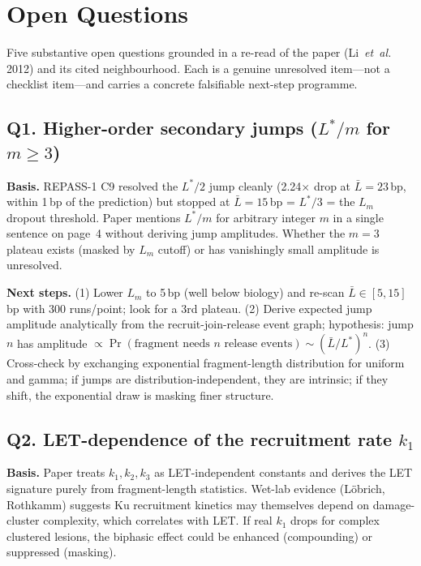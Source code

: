 \section*{Open Questions}

Five substantive open questions grounded in a re-read of the paper (Li~\emph{et~al.} 2012)
and its cited neighbourhood. Each is a genuine unresolved item---not a checklist
item---and carries a concrete falsifiable next-step programme.

\subsection*{Q1. Higher-order secondary jumps ($L^\ast/m$ for $m\geq 3$)}

\textbf{Basis.} REPASS-1 C9 resolved the $L^\ast/2$ jump cleanly (2.24$\times$ drop at
$\bar L=23$\,bp, within 1\,bp of the prediction) but stopped at $\bar L=15$\,bp = $L^\ast/3$
= the $L_m$ dropout threshold. Paper mentions $L^\ast/m$ for arbitrary integer $m$ in a
single sentence on page~4 without deriving jump amplitudes. Whether the $m{=}3$ plateau
exists (masked by $L_m$ cutoff) or has vanishingly small amplitude is unresolved.

\textbf{Next steps.} (1) Lower $L_m$ to 5\,bp (well below biology) and re-scan
$\bar L \in [5,15]$\,bp with 300 runs/point; look for a 3rd plateau. (2) Derive
expected jump amplitude analytically from the recruit-join-release event graph;
hypothesis: jump $n$ has amplitude $\propto \Pr(\text{fragment needs $n$ release events})
\sim (\bar L / L^\ast)^n$. (3) Cross-check by exchanging exponential fragment-length
distribution for uniform and gamma; if jumps are distribution-independent, they are
intrinsic; if they shift, the exponential draw is masking finer structure.

\subsection*{Q2. LET-dependence of the recruitment rate $k_1$}

\textbf{Basis.} Paper treats $k_1, k_2, k_3$ as LET-independent constants and derives the
LET signature purely from fragment-length statistics. Wet-lab evidence (L\"obrich,
Rothkamm) suggests Ku recruitment kinetics may themselves depend on damage-cluster
complexity, which correlates with LET. If real $k_1$ drops for complex clustered
lesions, the biphasic effect could be enhanced (compounding) or suppressed (masking).

